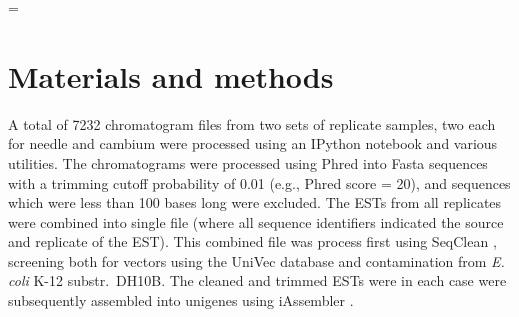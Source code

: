 \documentclass[11pt]{article}
\begin{document}
\newdimen\LTcapwidth \LTcapwidth=\textwidth









\section*{Materials and methods}\label{ss:mats}
A total of 7232 chromatogram files from two sets of replicate samples,
two each for needle and cambium were processed using an IPython
\citep[v 2.1]{per-gra:2007} notebook and various utilities.  The
chromatograms were processed using Phred \citep[v.\
020425]{ewing1998b} into Fasta sequences with a trimming cutoff
probability of 0.01 (e.g., Phred score = 20), and sequences which were
less than 100 bases long were excluded.  The ESTs from all replicates
were combined into single file (where all sequence identifiers
indicated the source and replicate of the EST).  This combined file
was process first using SeqClean \citep[v.\ 2/2011][default
parameters]{citeulike:1911083}, screening both for vectors using the
UniVec \citep{cochrane01012010} database and contamination from
\textit{E. coli} K-12 substr.\ DH10B.  The cleaned and trimmed ESTs
were in each case were subsequently assembled into unigenes using
iAssembler \citep[v.\ 1.3.2][default parameters]{zheng2011iassembler}.
\end{document}
